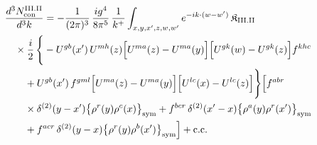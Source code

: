 \begin{align}\label{eq:H-III.II-2}
&\frac{d^{3}N^{\rm III.II}_{{\rm con}}}{d^{3}k}=-\frac{1}{(2\pi)^{3}}\, \frac{ig^{4}}{8\pi^{5}}\, \frac{1}{k^{+}} \int_{x,y,x',z,w,w'}e^{-ik\cdot(w-w')}\, \mathfrak{K}_{\rm III.II}\notag\\
&\quad \times \frac{i}{2}\, \Bigg\{-U^{gb}(x')\, U^{mh}(z)\Big[U^{ma}(z)-U^{ma}(y)\Big]\Big[U^{gk}(w)-U^{gk}(z)\Big]f^{khc}\notag\\
&\quad\quad +U^{gb}(x')\, f^{gml}\Big[U^{ma}(z)-U^{ma}(y)\Big]\Big[U^{lc}(x)-U^{lc}(z)\Big]\Bigg\} \Big[f^{abr}\notag\\
&\quad\quad \times \delta^{(2)}(y-x')\big\{\rho^{r}(y)\rho^{c}(x)\big\}_{\rm sym} +f^{bcr}\, \delta^{(2)}(x'-x)\big\{\rho^{a}(y)\rho^{r}(x')\big\}_{\rm sym}\notag\\
&\quad\quad +f^{acr}\, \delta^{(2)}(y-x)\big\{\rho^{r}(y)\rho^{b}(x')\big\}_{\rm sym}\Big] +{\rm c.c.}
\end{align}
